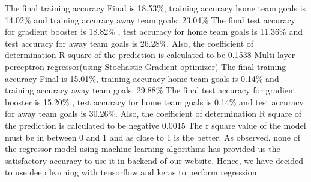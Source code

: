 The final training accuracy Final is 18.53\%, training accuracy home team goals is 14.02\% and training accuracy away team goals: 23.04\% \newline
The final test accuracy for gradient booster is 18.82\% , test accuracy for home team goals is 11.36\% and test accuracy for away team goals is 26.28\%. Also, the coefficient of determination R square of the prediction is calculated to be 0.1538 \newline
Multi-layer perceptron regressor(using Stochastic Gradient optimizer)\newline
The final training accuracy Final is 15.01\%, training accuracy home team goals is 0.14\% and training accuracy away team goals: 29.88\% \newline
The final test accuracy for gradient booster is 15.20\% , test accuracy for home team goals is 0.14\% and test accuracy for away team goals is 30.26\%. Also, the coefficient of determination R square of the prediction is calculated to be negative 0.0015 \newline 
The r square value of the model must be in between 0 and 1 and as close to 1 is the better.\newline
As observed, none of the regressor model using machine learning algorithms has provided us the satisfactory accuracy to use it in backend of our website. Hence, we have decided to use deep learning with tensorflow and keras to perform regression.\newline \newline
